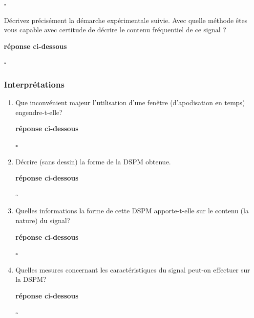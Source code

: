 \documentclass{article}
\newcommand{\debutrep}[1]{\color{blue}\begin{center} \hrulefill \textbf{ #1 } \hrulefill \end{center} }
\newcommand{\finrep}{\vspace*{5mm}\hfill $\square$\color{black}\vspace*{5mm}}
\begin{document}
\finrep

Décrivez précisément la démarche expérimentale suivie. Avec quelle méthode êtes vous capable avec certitude de décrire le contenu fréquentiel de ce signal ?

\debutrep{réponse ci-dessous}

\finrep

\subsubsection{Interprétations}

\begin{enumerate}
\renewcommand{\theenumi}{\Alph{enumi}}

\item Que inconvénient majeur l'utilisation d'une fenêtre (d'apodisation en temps) engendre-t-elle?

\debutrep{réponse ci-dessous}

\finrep

\item Décrire (sans dessin) la forme de la DSPM obtenue.

\debutrep{réponse ci-dessous}

\finrep

\item Quelles informations la forme de cette DSPM apporte-t-elle sur le contenu (la nature) du signal?

\debutrep{réponse ci-dessous}

\finrep

\item Quelles mesures concernant  les caractéristiques du signal peut-on effectuer sur la DSPM?

\debutrep{réponse ci-dessous}

\finrep

\end{enumerate}
\end{document}
